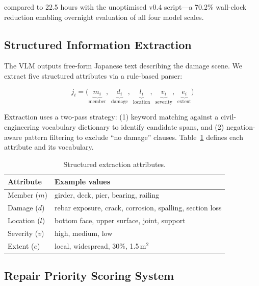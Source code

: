 \documentclass[twocolumn]{article}
\begin{document}
compared to 22.5 hours with the unoptimised v0.4 script---a 70.2\% wall-clock
reduction enabling overnight evaluation of all four model scales.

\subsection{Structured Information Extraction}
\label{sec:extraction}

The VLM outputs free-form Japanese text describing the damage scene.
We extract five structured attributes via a rule-based parser:

\begin{equation}
  j_i = \bigl(\underbrace{m_i}_{\text{member}},\;
               \underbrace{d_i}_{\text{damage}},\;
               \underbrace{l_i}_{\text{location}},\;
               \underbrace{v_i}_{\text{severity}},\;
               \underbrace{e_i}_{\text{extent}}\bigr)
  \label{eq:struct}
\end{equation}

Extraction uses a two-pass strategy: (1) keyword matching against a
civil-engineering vocabulary dictionary to identify candidate spans, and
(2) negation-aware pattern filtering to exclude ``no damage'' clauses.
Table~\ref{tab:extract_fields} defines each attribute and its vocabulary.

\begin{table}[h]
\centering
\caption{Structured extraction attributes.}
\label{tab:extract_fields}
\setlength{\tabcolsep}{3pt}
\begin{tabular}{lp{4.0cm}}
\toprule
\textbf{Attribute} & \textbf{Example values} \\
\midrule
Member ($m$)   & girder, deck, pier, bearing, railing \\
Damage ($d$)   & rebar exposure, crack, corrosion, spalling, section loss \\
Location ($l$) & bottom face, upper surface, joint, support \\
Severity ($v$) & high, medium, low \\
Extent ($e$)   & local, widespread, 30\%, 1.5\,m$^2$ \\
\bottomrule
\end{tabular}
\end{table}

\subsection{Repair Priority Scoring System}
\label{sec:scoring}
\end{document}
